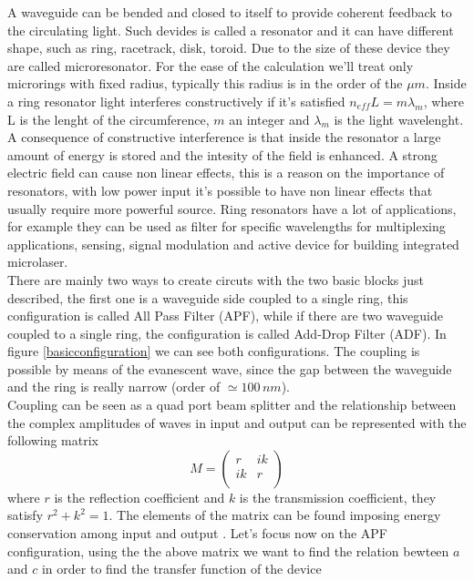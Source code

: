 A waveguide can be bended and closed to itself to provide coherent feedback to the circulating light. Such devides is called a resonator and it can have different shape, such as ring, racetrack, disk, toroid. Due to the size of these device they are called microresonator. For the ease of the calculation we'll treat only microrings with fixed radius, typically this radius is in the order of the $\mu m $. Inside a ring resonator light interferes constructively if it's satisfied $n_{eff} L = m \lambda_m$, where L is the lenght of the circumference, $m$ an integer and $\lambda_m$ is the light wavelenght. A consequence of constructive interference is that inside the resonator a large amount of energy is stored and the intesity of the field is enhanced. A strong electric field can cause non linear effects, this is a reason on the importance of resonators, with low power input it's possible to have non linear effects that usually require more powerful source. Ring resonators have a lot of applications, for example they can be used as filter for specific wavelengths for multiplexing applications, sensing, signal modulation and active device for building integrated microlaser.\\
There are mainly two ways to create circuts with the two basic blocks just described, the first one is a waveguide side coupled to a single ring, this configuration is called All Pass Filter (APF), while if there are two waveguide coupled to a single ring, the configuration is called Add-Drop Filter (ADF). In figure \ref{basicconfiguration} we can see both configurations. The coupling is possible by means of the evanescent wave, since the gap between the waveguide and the ring is really narrow (order of $\simeq 100\, nm$).\\
Coupling can be seen as a quad port beam splitter and the relationship between the complex amplitudes of waves in input and output can be represented with the following matrix
\begin{equation}M = \begin{pmatrix}
r & ik \\
ik & r\\
\end{pmatrix}\end{equation}
where $r$ is the reflection coefficient and $k$ is the transmission coefficient, they satisfy $r^2 +k^2 = 1$. The elements of the matrix can be found imposing energy conservation among input and output \cite{thesis:masi}. Let's focus now on the APF configuration, using the the above matrix we want to find the relation bewteen $a$ and $c$ in order to find the transfer function of the device
